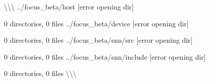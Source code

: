 \textbackslash{}\textquotesingle{}\textbackslash{}\textquotesingle{}\textbackslash{}\textquotesingle{} ../focus\+\_\+beta/host \mbox{[}error opening dir\mbox{]}

0 directories, 0 files ../focus\+\_\+beta/device \mbox{[}error opening dir\mbox{]}

0 directories, 0 files ../focus\+\_\+beta/snn/src \mbox{[}error opening dir\mbox{]}

0 directories, 0 files ../focus\+\_\+beta/snn/include \mbox{[}error opening dir\mbox{]}

0 directories, 0 files \textbackslash{}\textquotesingle{}\textbackslash{}\textquotesingle{}\textbackslash{}\textquotesingle{} 